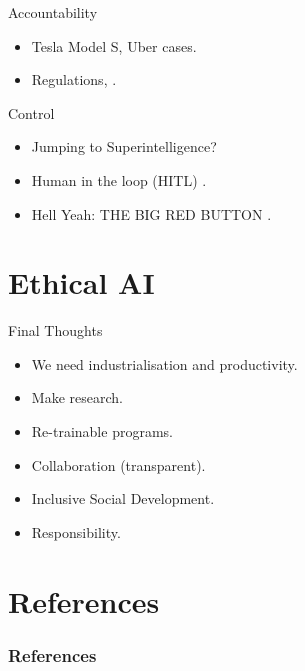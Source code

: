 \documentclass{beamer}
\begin{document}
\begin{frame}{Accountability}
\begin{itemize}
    \item Tesla Model S, Uber cases.
    \item Regulations, \citep{winfield2018ethical}.
\end{itemize}
\end{frame}

\begin{frame}{Control}
\begin{itemize}
    \item Jumping to Superintelligence?
    \item Human in the loop (HITL) \citep{rahwan2018society}.
    \item Hell Yeah: THE BIG RED BUTTON \citep{orseau2016safely}.
\end{itemize}
\end{frame}


\section{Ethical AI}
\begin{frame}{Final Thoughts}
\begin{itemize}
    \item We need industrialisation and productivity.
    \item Make research.
    \item Re-trainable programs.
    \item Collaboration (transparent).
    \item Inclusive Social Development.
    \item Responsibility.
\end{itemize}
\end{frame}



\section{References}

\begin{frame}[allowframebreaks]
\footnotesize
        \frametitle{References}
        
        
\normalsize
\end{frame}
\end{document}
